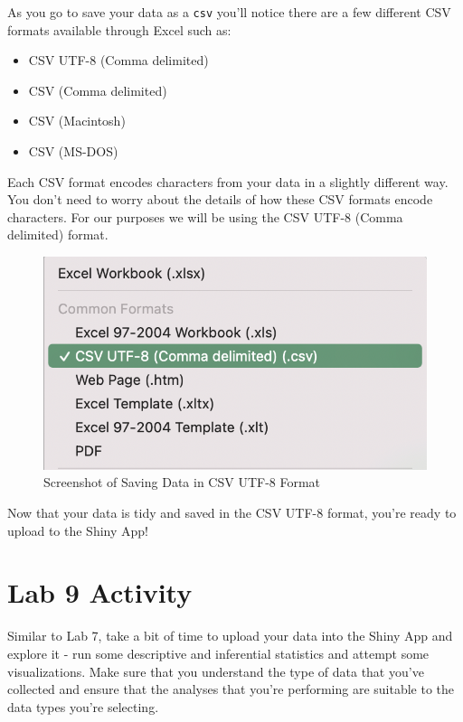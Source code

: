 \documentclass[
]{book}
\providecommand{\tightlist}{%
  \setlength{\itemsep}{0pt}\setlength{\parskip}{0pt}}
\begin{document}
As you go to save your data as a \texttt{csv} you'll notice there are a few different CSV formats available through Excel such as:

\begin{itemize}
\tightlist
\item
  CSV UTF-8 (Comma delimited)
\item
  CSV (Comma delimited)
\item
  CSV (Macintosh)
\item
  CSV (MS-DOS)
\end{itemize}

Each CSV format encodes characters from your data in a slightly different way. You don't need to worry about the details of how these CSV formats encode characters. For our purposes we will be using the CSV UTF-8 (Comma delimited) format.

\begin{figure}
\centering
\includegraphics{figures_images/csv-UTF8.png}
\caption{Screenshot of Saving Data in CSV UTF-8 Format}
\end{figure}

Now that your data is tidy and saved in the CSV UTF-8 format, you're ready to upload to the Shiny App!

\hypertarget{lab-9-activity}{%
\chapter*{Lab 9 Activity}\label{lab-9-activity}}

Similar to Lab 7, take a bit of time to upload your data into the Shiny App and explore it - run some descriptive and inferential statistics and attempt some visualizations. Make sure that you understand the type of data that you've collected and ensure that the analyses that you're performing are suitable to the data types you're selecting.
\end{document}
